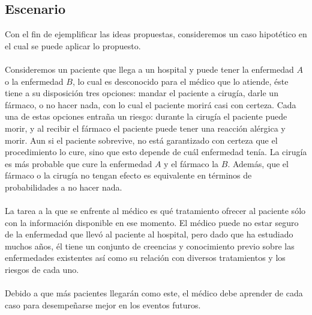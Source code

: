 \documentclass[11pt]{article}
\theoremstyle{plain}
\begin{document}
\subsection{Escenario}
Con el fin de ejemplificar las ideas propuestas, consideremos un caso hipotético en el cual se puede aplicar lo propuesto.\\
\\
\indent Consideremos un paciente que llega a un hospital y puede tener la enfermedad $A$ o la enfermedad $B$, lo cual es desconocido para el médico que lo atiende, éste tiene a su disposición tres opciones: mandar el paciente a cirugía, darle un fármaco, o no hacer nada, con lo cual el paciente morirá casi con certeza. Cada una de estas opciones entraña un riesgo: durante la cirugía el paciente puede morir, y al recibir el fármaco el paciente puede tener una reacción alérgica y morir. Aun si el paciente sobrevive, no está garantizado con certeza que el procedimiento lo cure, sino que esto depende de cuál enfermedad tenía. La cirugía es más probable que cure la enfermedad $A$ y el fármaco la $B$. Además, que el fármaco o la cirugía no tengan efecto es equivalente en términos de probabilidades a no hacer nada.\\
\\
\indent La tarea a la que se enfrente al médico es qué tratamiento ofrecer al paciente sólo con la información disponible en ese momento. El médico puede no estar seguro de la enfermedad que llevó al paciente al hospital, pero dado que ha estudiado muchos años, él tiene un conjunto de creencias y conocimiento previo sobre las enfermedades existentes así como su relación con diversos tratamientos y los riesgos de cada uno.\\
\\
\indent Debido a que más pacientes llegarán como este, el médico debe aprender de cada caso para desempeñarse mejor en los eventos futuros. 
\end{document}
